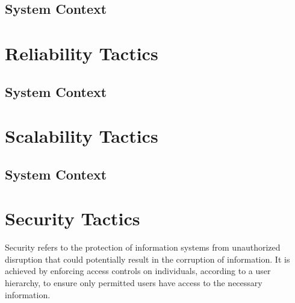 \documentclass[11pt,fleqn]{book} %
\begin{document}
	\subsection{System Context}
\section{Reliability Tactics}
	\subsection{System Context}
\section{Scalability Tactics}
	\subsection{System Context}
\section{Security Tactics}
	Security refers to the protection of information systems from unauthorized disruption that could potentially result in the corruption of information. It is achieved by enforcing access controls on individuals, according to a user hierarchy, to ensure only permitted users have access to the necessary information.
\end{document}
